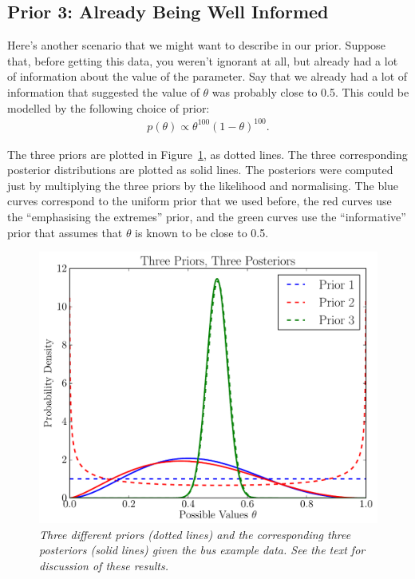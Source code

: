 \subsection{Prior 3: Already Being Well Informed}
Here's another scenario that we might want to describe in our prior.
Suppose that, before getting this data, you weren't ignorant at all, but already
had a lot of information about the value of the parameter. Say that we already had a lot of information that
suggested the value of $\theta$ was probably close to 0.5. This could be modelled
by the following choice of prior:
\begin{eqnarray}
p(\theta) \propto \theta^{100}(1 - \theta)^{100}.\label{eq:prior3}
\end{eqnarray}

The three priors are plotted in Figure~\ref{fig:three_priors}, as dotted lines.
The three corresponding posterior distributions are plotted as solid lines.
The posteriors were computed just by multiplying the three priors by the likelihood
and normalising.
The blue curves correspond to the uniform prior that we used before, the red
curves use the ``emphasising the extremes'' prior, and the green curves use the
``informative'' prior that assumes that $\theta$ is known to be close to 0.5.

\begin{figure}[h!]
\begin{center}
\includegraphics[scale=0.6]{Figures/three_priors.pdf}
\caption{\it Three different priors (dotted lines) and the corresponding
three posteriors (solid lines) given the bus example data. See the text
for discussion of these results.\label{fig:three_priors}}
\end{center}
\end{figure}

